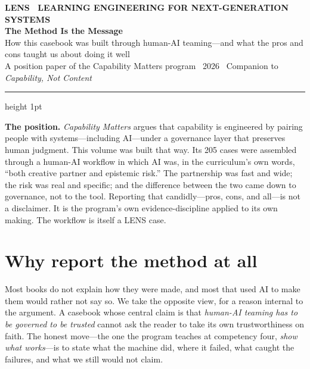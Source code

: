 \documentclass[11pt]{article}
\newcommand{\lead}[1]{{\color{lensaccent}\bfseries #1}}
\begin{document}
\begin{flushleft}
{\footnotesize\color{lensaccent}\bfseries LENS \textbullet\ LEARNING ENGINEERING FOR NEXT-GENERATION SYSTEMS}\\[0.9em]
{\color{lensink}\fontsize{27}{31}\selectfont\bfseries The Method Is the Message}\\[0.35em]
{\color{lensink}\large How this casebook was built through human-AI teaming---and what the pros and cons taught us about doing it well}\\[1.1em]
{\footnotesize\color{lensquote}A position paper of the Capability Matters program \textbullet\ 2026 \textbullet\ Companion to \emph{Capability, Not Content}}
\end{flushleft}

\vspace{0.3em}
{\color{lensrule}\hrule height 1pt}
\vspace{1.2em}

\begin{thesisbox}
\lead{The position.} \emph{Capability Matters} argues that capability is engineered by pairing people with systems---including AI---under a governance layer that preserves human judgment. This volume was built that way. Its 205 cases were assembled through a human-AI workflow in which AI was, in the curriculum's own words, ``both creative partner and epistemic risk.'' The partnership was fast and wide; the risk was real and specific; and the difference between the two came down to governance, not to the tool. Reporting that candidly---pros, cons, and all---is not a disclaimer. It is the program's own evidence-discipline applied to its own making. The workflow is itself a LENS case.
\end{thesisbox}

\section{Why report the method at all}

Most books do not explain how they were made, and most that used AI to make them would rather not say so. We take the opposite view, for a reason internal to the argument. A casebook whose central claim is that \emph{human-AI teaming has to be governed to be trusted} cannot ask the reader to take its own trustworthiness on faith. The honest move---the one the program teaches at competency four, \emph{show what works}---is to state what the machine did, where it failed, what caught the failures, and what we still would not claim.
\end{document}
